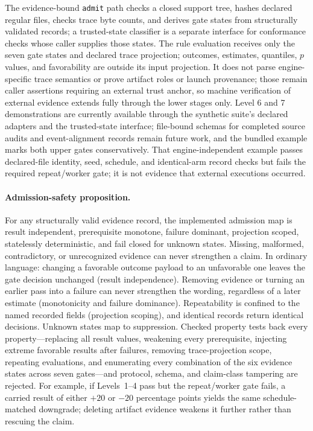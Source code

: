 \documentclass[aps,reprint,superscriptaddress,longbibliography,floatfix]{revtex4-2}
\begin{document}
The evidence-bound \texttt{admit} path checks a closed support tree, hashes
declared regular files, checks trace byte counts, and derives gate states from
structurally validated records; a trusted-state classifier is a separate
interface for conformance checks whose caller supplies those states.  The rule
evaluation receives only the seven gate states and declared trace projection;
outcomes, estimates, quantiles, $p$ values, and favorability are outside its
input projection.  It does not parse engine-specific trace semantics or prove
artifact roles or launch provenance; those remain caller assertions requiring
an external trust anchor, so machine verification of external evidence extends
fully through the lower stages only.  Level 6 and 7 demonstrations are
currently available through the synthetic suite's declared adapters and the
trusted-state interface; file-bound schemas for completed source audits and
event-alignment records remain future work, and the bundled example marks both
upper gates conservatively.  That engine-independent example passes
declared-file identity, seed, schedule, and identical-arm record checks but
fails the required repeat/worker gate; it is not evidence that external
executions occurred.

\paragraph{Admission-safety proposition.}
For any structurally valid evidence record, the implemented admission map is
result independent, prerequisite monotone, failure dominant, projection
scoped, statelessly deterministic, and fail closed for unknown states.
Missing, malformed, contradictory, or unrecognized evidence can never
strengthen a claim.  In ordinary language: changing a favorable outcome
payload to an unfavorable one leaves the gate decision unchanged (result
independence).  Removing evidence or turning an earlier pass into a failure
can never strengthen the wording, regardless of a later estimate (monotonicity
and failure dominance).  Repeatability is confined to the named recorded
fields (projection scoping), and identical records return identical decisions.
Unknown states map to suppression.  Checked property tests back every
property---replacing all result values, weakening every prerequisite,
injecting extreme favorable results after failures, removing trace-projection
scope, repeating evaluations, and enumerating every combination of the six
evidence states across seven gates---and protocol, schema, and claim-class
tampering are rejected.  For example, if Levels~1--4 pass but the
repeat/worker gate fails, a carried result of either $+20$ or $-20$ percentage
points yields the same schedule-matched downgrade; deleting artifact evidence
weakens it further rather than rescuing the claim.
\end{document}
